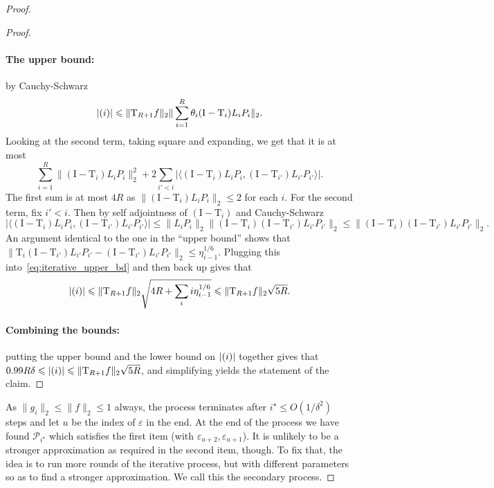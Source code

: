 \documentclass[11pt]{article}
\newcommand\card[1]{\left| {#1} \right|}
\newcommand\norm[1]{\| #1 \|}
\newcommand\inner[2]{\langle{#1},{#2}\rangle}
\newcommand\eps{\varepsilon}
\renewcommand\leq{\leqslant}
\newcommand{\rom}[1]{\uppercase\expandafter{\romannumeral #1\relax}}
\begin{document}
\begin{proof}
\begin{proof}
        \paragraph{The upper bound:} by Cauchy-Schwarz
        \[
        \card{(\rom{1})}
        \leq \norm{\mathrm{T}_{R+1}f}_2
        \norm{\sum\limits_{i=1}^{R}\theta_i (\mathrm{I}-\mathrm{T}_i)L_i P_i}_2.
        \]
        Looking at the second term, taking square and expanding, we get that it is at most
        \begin{equation}\label{eq:iterative_upper_bd}
        \sum\limits_{i=1}^{R}
        \norm{(\mathrm{I}-\mathrm{T}_i)L_i P_i}_2^2
        +2\sum\limits_{i'<i}
        \card{
        \inner{
        (\mathrm{I}-\mathrm{T}_i)L_i P_i}{(\mathrm{I}-\mathrm{T}_{i'})L_{i'} P_{i'}}}.
        \end{equation}
        The first sum is at most $4R$ as 
        $\norm{(\mathrm{I}-\mathrm{T}_i)L_i P_i}_2\leq 2$ for each $i$. For the second term, fix $i'<i$. Then by self adjointness of $(\mathrm{I}-\mathrm{T}_i)$ and Cauchy-Schwarz
        \[
        \card{\inner{
        (\mathrm{I}-\mathrm{T}_i)L_i P_i}{(\mathrm{I}-\mathrm{T}_{i'})L_{i'} P_{i'}}}
        \leq \norm{L_i P_i}_2\norm{(\mathrm{I}-\mathrm{T}_i)(\mathrm{I}-\mathrm{T}_{i'})L_{i'} P_{i'}}_2\leq 
        \norm{(\mathrm{I}-\mathrm{T}_i)(\mathrm{I}-\mathrm{T}_{i'})L_{i'} P_{i'}}_2.
        \]
        An argument identical to the one in the ``upper bound'' shows that 
        $\norm{\mathrm{T}_i(\mathrm{I}-\mathrm{T}_{i'})L_{i'} P_{i'}-(\mathrm{I}-\mathrm{T}_{i'})L_{i'} P_{i'}}_2\leq \eta_{i-1}^{1/6}$. Plugging this into~\eqref{eq:iterative_upper_bd} and then back up gives that
        \[
        \card{(\rom{1})}\leq \norm{\mathrm{T}_{R+1}f}_2
        \sqrt{4R+\sum\limits_{i}i\eta_{i-1}^{1/6}}
        \leq 
        \norm{\mathrm{T}_{R+1}f}_2\sqrt{5R}.
        \]

        \paragraph{Combining the bounds:} putting the upper bound and the lower bound on $\card{(\rom{1})}$ together gives that 
        $0.99 R \delta\leq \card{(\rom{1})}\leq \norm{\mathrm{T}_{R+1}f}_2\sqrt{5R}$, and simplifying yields the statement of the claim.
    \end{proof}
    As $\norm{g_i}_2\leq \norm{f}_2\leq 1$ always, the process terminates after $i^{\star}\leq O(1/\delta^2)$ steps and let $u$ be the index of $\eps$ in the end. At the end of the process we have found $\mathcal{P}_{i^{\star}}$  which satisfies the first item (with $\eps_{u+2},\eps_{u+1}$). It is unlikely to be a stronger approximation as required in the second item, though.
    To fix that, the idea is to run more rounds of the iterative process, but with different parameters so as to find a stronger approximation. We call this the secondary process.
    

\end{proof}
\end{document}
